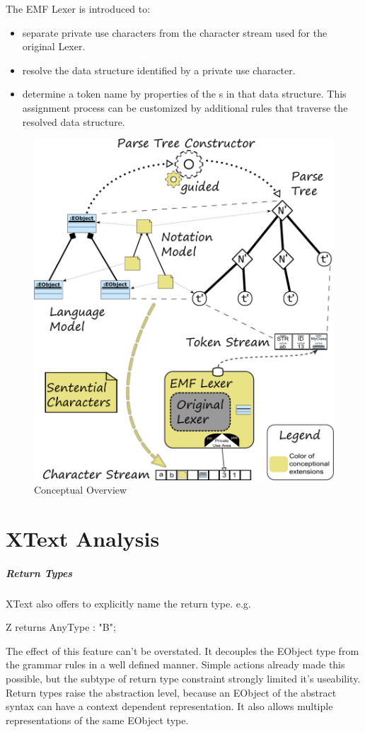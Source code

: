 The EMF Lexer is introduced to:
\begin{itemize}
	\item separate private use characters from the character stream used for the original Lexer.
	\item resolve the data structure identified by a private use character.
	\item determine a token name by properties of the s in that data structure. This assignment process can be customized by additional rules that traverse the resolved data structure.
\end{itemize}


\begin{figure}
\centering
\includegraphics[scale=0.75]{gfx/ex/Concept} 
\caption{Conceptual Overview}
\label{ConceptFigure}
\end{figure}





\section{XText Analysis}
\subparagraph{Return Types}
XText also offers to explicitly name the return type. e.g.
\begin{xtxt}
Z returns AnyType	: "B";
\end{xtxt}
The effect of this feature can't be overstated.  It decouples the EObject type from the grammar rules in a well defined manner. Simple actions already made this possible, but the subtype of return type constraint strongly limited it's useability. Return types raise the abstraction level, because an EObject of the abstract syntax can have a context dependent representation. It also allows multiple representations of the same EObject type.

